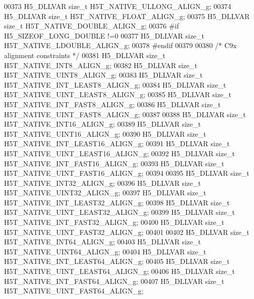 \begin{DoxyCode}
00373 H5\_DLLVAR \textcolor{keywordtype}{size\_t}    H5T\_NATIVE\_ULLONG\_ALIGN\_g;
00374 H5\_DLLVAR \textcolor{keywordtype}{size\_t}    H5T\_NATIVE\_FLOAT\_ALIGN\_g;
00375 H5\_DLLVAR \textcolor{keywordtype}{size\_t}    H5T\_NATIVE\_DOUBLE\_ALIGN\_g;
00376 \textcolor{preprocessor}{#if H5\_SIZEOF\_LONG\_DOUBLE !=0}
00377 H5\_DLLVAR \textcolor{keywordtype}{size\_t}    H5T\_NATIVE\_LDOUBLE\_ALIGN\_g;
00378 \textcolor{preprocessor}{#endif}
00379 
00380 \textcolor{comment}{/* C9x alignment constraints */}
00381 H5\_DLLVAR \textcolor{keywordtype}{size\_t}    H5T\_NATIVE\_INT8\_ALIGN\_g;
00382 H5\_DLLVAR \textcolor{keywordtype}{size\_t}    H5T\_NATIVE\_UINT8\_ALIGN\_g;
00383 H5\_DLLVAR \textcolor{keywordtype}{size\_t}    H5T\_NATIVE\_INT\_LEAST8\_ALIGN\_g;
00384 H5\_DLLVAR \textcolor{keywordtype}{size\_t}    H5T\_NATIVE\_UINT\_LEAST8\_ALIGN\_g;
00385 H5\_DLLVAR \textcolor{keywordtype}{size\_t}    H5T\_NATIVE\_INT\_FAST8\_ALIGN\_g;
00386 H5\_DLLVAR \textcolor{keywordtype}{size\_t}    H5T\_NATIVE\_UINT\_FAST8\_ALIGN\_g;
00387 
00388 H5\_DLLVAR \textcolor{keywordtype}{size\_t}    H5T\_NATIVE\_INT16\_ALIGN\_g;
00389 H5\_DLLVAR \textcolor{keywordtype}{size\_t}    H5T\_NATIVE\_UINT16\_ALIGN\_g;
00390 H5\_DLLVAR \textcolor{keywordtype}{size\_t}    H5T\_NATIVE\_INT\_LEAST16\_ALIGN\_g;
00391 H5\_DLLVAR \textcolor{keywordtype}{size\_t}    H5T\_NATIVE\_UINT\_LEAST16\_ALIGN\_g;
00392 H5\_DLLVAR \textcolor{keywordtype}{size\_t}    H5T\_NATIVE\_INT\_FAST16\_ALIGN\_g;
00393 H5\_DLLVAR \textcolor{keywordtype}{size\_t}    H5T\_NATIVE\_UINT\_FAST16\_ALIGN\_g;
00394 
00395 H5\_DLLVAR \textcolor{keywordtype}{size\_t}    H5T\_NATIVE\_INT32\_ALIGN\_g;
00396 H5\_DLLVAR \textcolor{keywordtype}{size\_t}    H5T\_NATIVE\_UINT32\_ALIGN\_g;
00397 H5\_DLLVAR \textcolor{keywordtype}{size\_t}    H5T\_NATIVE\_INT\_LEAST32\_ALIGN\_g;
00398 H5\_DLLVAR \textcolor{keywordtype}{size\_t}    H5T\_NATIVE\_UINT\_LEAST32\_ALIGN\_g;
00399 H5\_DLLVAR \textcolor{keywordtype}{size\_t}    H5T\_NATIVE\_INT\_FAST32\_ALIGN\_g;
00400 H5\_DLLVAR \textcolor{keywordtype}{size\_t}    H5T\_NATIVE\_UINT\_FAST32\_ALIGN\_g;
00401 
00402 H5\_DLLVAR \textcolor{keywordtype}{size\_t}    H5T\_NATIVE\_INT64\_ALIGN\_g;
00403 H5\_DLLVAR \textcolor{keywordtype}{size\_t}    H5T\_NATIVE\_UINT64\_ALIGN\_g;
00404 H5\_DLLVAR \textcolor{keywordtype}{size\_t}    H5T\_NATIVE\_INT\_LEAST64\_ALIGN\_g;
00405 H5\_DLLVAR \textcolor{keywordtype}{size\_t}    H5T\_NATIVE\_UINT\_LEAST64\_ALIGN\_g;
00406 H5\_DLLVAR \textcolor{keywordtype}{size\_t}    H5T\_NATIVE\_INT\_FAST64\_ALIGN\_g;
00407 H5\_DLLVAR \textcolor{keywordtype}{size\_t}    H5T\_NATIVE\_UINT\_FAST64\_ALIGN\_g;

\end{DoxyCode}
